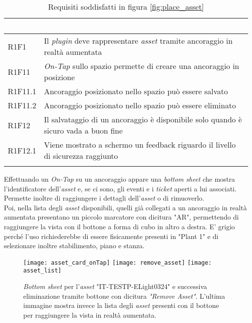 {
    \setlength{\freewidth}{\dimexpr\textwidth-10\tabcolsep}
    \renewcommand{\arraystretch}{1.5}
    \centering
    \setlength{\aboverulesep}{0pt}
    \setlength{\belowrulesep}{0pt}
    \begin{longtable}{C{.15\freewidth} C{.965\freewidth}}
       \toprule
    \textcolor{white}{\textbf{Codice}}&
    \textcolor{white}{\textbf{Descrizione}}\\
    \toprule
    \endhead

    R1F1 & Il \textit{plugin} deve rappresentare \textit{asset} tramite ancoraggio in realtà aumentata\\
    R1F11 & \textit{On-Tap} sullo spazio permette di creare una ancoraggio in posizione\\
    R1F11.1 & Ancoraggio posizionato nello spazio può essere salvato\\
    R1F11.2 & Ancoraggio posizionato nello spazio può essere eliminato\\
    R1F12 & Il salvataggio di un ancoraggio è disponibile solo quando è sicuro vada a buon fine\\
    R1F12.1 & Viene mostrato a schermo un feedback riguardo il livello di sicurezza raggiunto\\

    \bottomrule
    \caption{Requisiti soddisfatti in figura \ref{fig:place_asset}}
    \end{longtable}
}

Effettuando un \textit{On-Tap} su un ancoraggio appare una \textit{bottom sheet} che mostra l'identificatore dell'\textit{asset} e, se ci sono, gli eventi e i \textit{ticket} aperti a lui associati. Permette inoltre di raggiungere i dettagli dell'\textit{asset} o di rimuoverlo.\\
Poi, nella lista degli \textit{asset} disponibili, quelli già collegati a un ancoraggio in realtà aumentata presentano un piccolo marcatore con dicitura "AR", permettendo di raggiungere la vista con il bottone a forma di cubo in altro a destra. E' grigio perché l'uso richiederebbe di essere fisicamente presenti in "Plant 1" e di selezionare inoltre stabilimento, piano e stanza.

\begin{figure}[H]
  \centering
  \texttt{[image: asset\_card\_onTap]}\hfill
  \texttt{[image: remove\_asset]}\hfill
  \texttt{[image: asset\_list]}
  \caption[\textit{Bottom sheet asset} per eliminazione e lista \textit{asset}]{\textit{Bottom sheet} per l'\textit{asset} "IT-TESTP-ELight0324" e successiva eliminazione tramite bottone con dicitura \textit{"Remove Asset"}. L'ultima immagine mostra invece la lista degli \textit{asset} presenti con il bottone per raggiungere la vista in realtà aumentata.}
  \label{fig:asset_list}
\end{figure}

